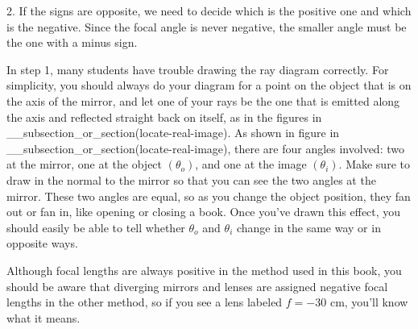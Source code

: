 2. If the signs are opposite, we need to decide which is the
positive one and which is the negative. Since the focal
angle is never negative, the smaller angle must be the
one with a minus sign.

In step 1, many students have trouble drawing the ray
diagram correctly. For simplicity, you should always do your
diagram for a point on the object that is on the axis of the
mirror, and let one of your rays be the one that is emitted
along the axis and reflected straight back on itself, as in
the figures in __subsection_or_section(locate-real-image). As shown in figure  in
__subsection_or_section(locate-real-image), there are four angles involved: two at the
mirror, one at the object $(\theta_o)$, and one at the image
$(\theta_i)$. Make sure to draw in the normal to the mirror
so that you can see the two angles at the mirror. These two
angles are equal, so as you change the object position, they
fan out or fan in, like opening or closing a book. Once
you've drawn this effect, you should easily be able to tell
whether $\theta_o$ and $\theta_i$ change in the same way
or in opposite ways.

Although focal lengths are always positive in the method
used in this book, you should be aware that diverging
mirrors and lenses are assigned negative focal lengths in
the other method, so if you see a lens labeled
$f=-30$ cm, you'll know what it means.

